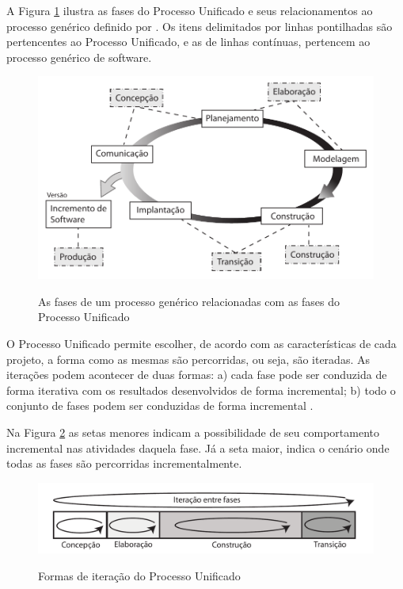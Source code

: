 A Figura \ref{fig:processo_unificado} ilustra as fases do Processo Unificado e seus relacionamentos ao processo genérico definido por . Os itens delimitados por linhas pontilhadas são pertencentes ao Processo Unificado, e as de linhas contínuas, pertencem ao processo genérico de software.

\begin{figure}[!h]
\centering
\caption{As fases de um processo genérico relacionadas com as fases do Processo Unificado}
\includegraphics{pdfs/img-processo-unificado.pdf}
\label{fig:processo_unificado} 
\end{figure}

O Processo Unificado permite escolher, de acordo com as características de cada projeto, a forma como as mesmas são percorridas, ou seja, são iteradas. As iterações podem acontecer de duas formas: a) cada fase pode ser conduzida de forma iterativa com os resultados desenvolvidos de forma incremental; b) todo o conjunto de fases podem ser conduzidas de forma incremental \cite{sommerville10}.

Na Figura \ref{fig:processo_unificado_iteracoes} as setas menores indicam a possibilidade de seu comportamento incremental nas atividades daquela fase. Já a seta maior, indica o cenário onde todas as fases são percorridas incrementalmente.

\begin{figure}[!h]
\centering
\caption{Formas de iteração do Processo Unificado}
\includegraphics[width=1.0\textwidth]{pdfs/img-processo-unificado-fases.pdf}
\label{fig:processo_unificado_iteracoes} 
\end{figure}

